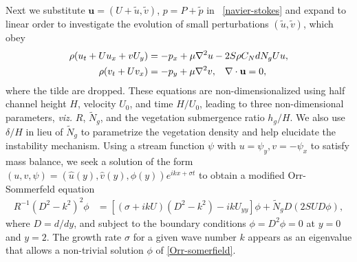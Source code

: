 \documentclass[12pt]{report}   %
\newcommand{\bu}{\mathbf{u}}
\newcommand{\hg}{h_g}
\newcommand{\Rey}{{R}}
\newcommand{\Ndg}{\tilde{N}_g}
\begin{document}
Next we substitute $\bu = (U+\tilde{u}, \tilde{v})$, $p=P+\tilde{p}$ in ~\eqref{navier-stokes} and expand to linear order to investigate the evolution of small perturbations $(\tilde{u}, \tilde{v})$, which obey
\begin{equation}
\begin{split}
\rho(u_t+U u_x+vU_y) &= -p_x+ {\mu}\nabla^2u-2S\rho C_{N}dN_{g}Uu, \\
\rho(v_t+ Uv_x) &= -p_y+ {\mu}\nabla^2v, \hspace{0.3cm} \nabla\cdot\bu=0,
\label{LinearizedNavierStokes}
\end{split} 
\end{equation}
where the tilde are dropped.
These equations are non-dimensionalized using half channel height $H$, velocity $U_0$, and time $H/U_0$, leading to three non-dimensional parameters, \textit{viz.} $\Rey$, $\Ndg$, and the vegetation submergence ratio $\hg/H$. 
We also use $\delta/H$ in lieu of $\Ndg$ to parametrize the vegetation density and help elucidate the instability mechanism. 
Using a stream function $\psi$ with $u = \psi_{y}, v= -\psi_x$ to satisfy mass balance, we seek a solution of 
the form $\left(u,v,\psi \right)= \left(\hat u(y), \hat v(y), \phi(y) \right)e^{ikx+\sigma t}$ to obtain a modified Orr-Sommerfeld equation \cite{Drazin81,Chen97,Chu91} 
\begin{equation}
\begin{split}
\Rey^{-1}\left(D^2 -k^{2} \right)^2\phi &= \left[ \left({\sigma}+ikU\right) \left(D^2-k^2\right) -ikU_{yy}\right]\phi + \Ndg D\left(2 S U D \phi\right),
\label{Orr-somerfield}
\end{split}
\end{equation}
where $D=d/dy$, and subject to the boundary conditions $\phi = D^2\phi = 0$ at $y=0$ and $y=2$. 
The growth rate $\sigma$ for a given wave number $k$ appears as an eigenvalue that allows a non-trivial solution $\phi$ of  \eqref{Orr-somerfield}.
\end{document}

